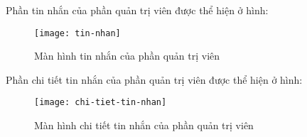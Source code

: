 \documentclass[../Thesis.tex]{subfiles}
\begin{document}
        Phần tin nhắn của phần quản trị viên được thể hiện ở hình:
        \begin{figure}[ht!]
            \centering\texttt{[image: tin-nhan]}
            \caption{Màn hình tin nhắn của phần quản trị viên}
            \label{fig:tin-nhan}
        \end{figure}

        Phần chi tiết tin nhắn của phần quản trị viên được thể hiện ở hình:
        \begin{figure}[ht!]
            \centering\texttt{[image: chi-tiet-tin-nhan]}
            \caption{Màn hình chi tiết tin nhắn của phần quản trị viên}
            \label{fig:chi-tiet-tin-nhan}
        \end{figure}
\end{document}
